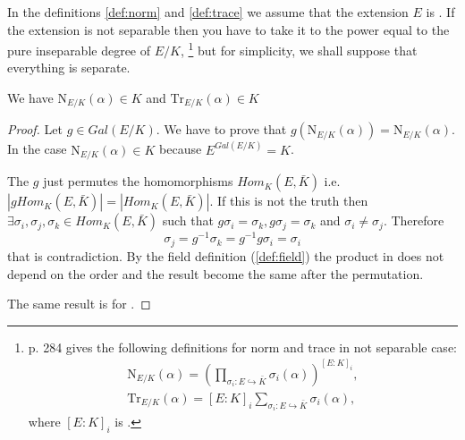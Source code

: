 In the definitions \ref{def:norm} and \ref{def:trace} we assume that
the extension $E$ is . If the
extension is not separable then you have to take it to the power
equal to the pure inseparable degree of $E/K$,
\footnote{
  \cite{bib:lang} p. 284 gives the following definitions for norm and
  trace in not separable case:
  \begin{eqnarray}
  \mathrm {N}_{E/K}\left(\alpha\right) =
  \left(
  \prod_{\sigma_i: E \hookrightarrow \bar{K}}
  \sigma_i\left(\alpha\right)
  \right)^{\left[E:K\right]_i},
  \nonumber \\
  \mathrm {Tr}_{E/K}\left(\alpha\right) =
  \left[E:K\right]_i
  \sum_{\sigma_i: E \hookrightarrow \bar{K}} \sigma_i\left(\alpha\right),
  \nonumber
  \end{eqnarray}
  where $\left[E:K\right]_i$ is .
}
but for simplicity,
we shall suppose that everything is separate.

\begin{remark}
  We have $\mathrm {N}_{E/K}\left(\alpha\right) \in K$ and
  $\mathrm {Tr}_{E/K}\left(\alpha\right) \in K$
  \label{rem:lec9_add}
  \begin{proof}
    Let $g \in Gal\left(E/K\right)$. We have to prove that
    $g\left(\mathrm {N}_{E/K}\left(\alpha\right)\right) =
    \mathrm {N}_{E/K}\left(\alpha\right)$. In the case
    $\mathrm {N}_{E/K}\left(\alpha\right) \in K$ because
    $E^{Gal\left(E/K\right)} = K$.

    The $g$ just permutes the homomorphisms $Hom_K\left(E,
    \bar{K}\right)$ i.e.
    $\left|g Hom_K\left(E, \bar{K}\right)\right| =
    \left|Hom_K\left(E, \bar{K}\right)\right|$. If this is not the
    truth then $\exists \sigma_i, \sigma_j, \sigma_k \in Hom_K\left(E,
    \bar{K}\right)$ such that
    $g\sigma_i = \sigma_k, g \sigma_j = \sigma_k$ and
    $\sigma_i \ne \sigma_j$.
    Therefore
    \[
    \sigma_j = g^{-1} \sigma_k = g^{-1} g \sigma_i = \sigma_i
    \]
    that is contradiction.
    By  the field definition
    (\ref{def:field}) the product in
     does not depend on the order and the
    result become the same after the permutation.

    The same result is for .
  \end{proof}
\end{remark}

